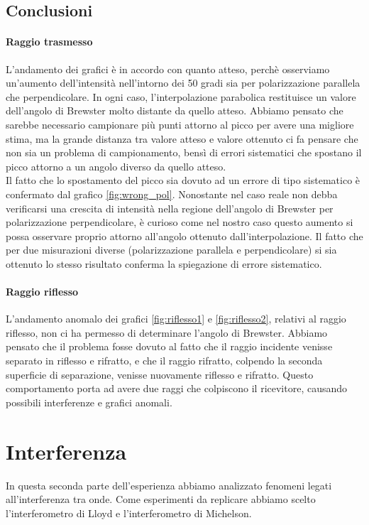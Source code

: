 \documentclass[letterpaper,12pt]{article}
\begin{document}
\subsection{Conclusioni}
\paragraph*{Raggio trasmesso} L'andamento dei grafici è in accordo con quanto atteso, perchè osserviamo
un'aumento dell'intensità nell'intorno dei 50 gradi sia per polarizzazione parallela che perpendicolare.
In ogni caso, l'interpolazione parabolica restituisce un valore dell'angolo di Brewster molto distante 
da quello atteso. Abbiamo pensato che sarebbe necessario campionare più punti attorno al picco 
per avere una migliore stima, ma la grande distanza tra valore atteso e valore ottenuto 
ci fa pensare che non sia un problema di campionamento, bensì di errori sistematici che spostano il picco attorno 
a un angolo diverso da quello atteso.\\
Il fatto che lo spostamento del picco sia dovuto ad un errore di tipo sistematico è confermato dal grafico 
\ref{fig:wrong_pol}. Nonostante nel caso reale non debba verificarsi una crescita di intensità nella regione 
dell'angolo di Brewster per polarizzazione perpendicolare, è curioso come nel nostro caso questo aumento 
si possa osservare proprio attorno all'angolo ottenuto dall'interpolazione. Il fatto che per due misurazioni 
diverse (polarizzazione parallela e perpendicolare) si sia ottenuto lo stesso risultato conferma 
la spiegazione di errore sistematico.


\paragraph*{Raggio riflesso} L'andamento anomalo dei grafici \ref{fig:riflesso1} e \ref{fig:riflesso2}, relativi 
al raggio riflesso, non ci ha permesso di determinare l'angolo di Brewster. Abbiamo pensato che il problema 
fosse dovuto al fatto che il raggio incidente venisse separato in riflesso e rifratto, e che il raggio rifratto, 
colpendo la seconda superficie di separazione, venisse nuovamente riflesso e rifratto. Questo comportamento porta 
ad avere due raggi che colpiscono il ricevitore, causando possibili interferenze e grafici anomali.\\


\newpage
\section{Interferenza}
In questa seconda parte dell'esperienza abbiamo analizzato fenomeni legati all'interferenza tra onde. Come esperimenti da replicare 
abbiamo scelto l'interferometro di Lloyd e l'interferometro di Michelson.\\
\end{document}
